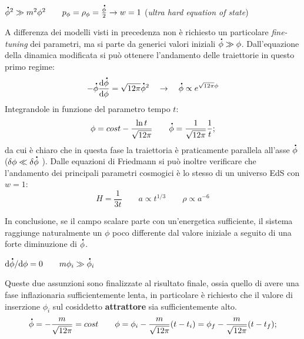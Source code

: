 \vspace{1em}
\begin{example} $\accentset{\mbox{\large\bfseries .}}{\phi}^2 \gg m^2 \phi^2 \qquad p_\phi = \rho_\phi = \frac{\accentset{\mbox{\large\bfseries .}}{\phi}}{2} \rightarrow w=1$ (\textit{ultra hard equation of state})
\end{example}
\noindent A differenza dei modelli visti in precedenza non è richiesto un particolare \textit{fine-tuning} dei parametri, ma si parte da generici valori iniziali $\accentset{\mbox{\large\bfseries .}}{\phi} \gg \phi$. Dall'equazione della dinamica modificata si può ottenere l'andamento delle traiettorie in questo primo regime:
\begin{equation}
    -\accentset{\mbox{\large\bfseries .}}{\phi} \frac{\mathrm{d} \accentset{\mbox{\large\bfseries .}}{\phi}}{\mathrm{d} \phi} = \sqrt{12 \pi} \accentset{\mbox{\large\bfseries .}}{\phi}^2 \quad \rightarrow \quad \accentset{\mbox{\large\bfseries .}}{\phi} \propto e^{\sqrt{12 \pi} \phi}
\end{equation}
Integrandole in funzione del parametro tempo $t$:
\begin{equation}
    \phi= cost - \frac{\ln t}{\sqrt{12 \pi}} \qquad \accentset{\mbox{\large\bfseries .}}{\phi} = \frac{1}{\sqrt{12 \pi}}\frac{1}{t};
\end{equation}
da cui è chiaro che in questa fase la traiettoria è praticamente parallela all'asse $\accentset{\mbox{\large\bfseries .}}{\phi}$ ($\delta \phi \ll \delta\accentset{\mbox{\large\bfseries .}}{\phi}$ ). Dalle equazioni di Friedmann si può inoltre verificare che l'andamento dei principali parametri cosmogici è lo stesso di un universo EdS con $w=1$:
\begin{equation}
    H = \frac{1}{3t} \qquad a \propto t^{1/3} \qquad \rho \propto a^{-6}
\end{equation}

In conclusione, se il campo scalare parte con un'energetica sufficiente, il sistema raggiunge naturalmente un $\phi$ poco differente dal valore iniziale a seguito di una forte diminuzione di $\accentset{\mbox{\large\bfseries .}}{\phi}$.

\vspace{1em}
\begin{example}[Inflazione] 
    $\mathrm{d} \accentset{\mbox{\large\bfseries .}}{\phi} / \mathrm{d} \phi=0 \qquad m\phi_i \gg \accentset{\mbox{\large\bfseries .}}{\phi}_i$
\end{example}

Queste due assunzioni sono finalizzate al risultato finale, ossia quello di avere una fase inflazionaria sufficientemente lenta, in particolare è richiesto che il valore di inserzione $\phi_i$ sul cosiddetto \textbf{attrattore} sia sufficientemente alto. 
\begin{equation}
    \accentset{\mbox{\large\bfseries .}}{\phi} =  -\frac{m}{\sqrt{12 \pi}} = cost \qquad \phi= \phi_i - \frac{m}{\sqrt{12 \pi}} (t-t_i) = \phi_f - \frac{m}{\sqrt{12 \pi}} (t-t_f); \label{eq:phidotphiinfl}
\end{equation}

